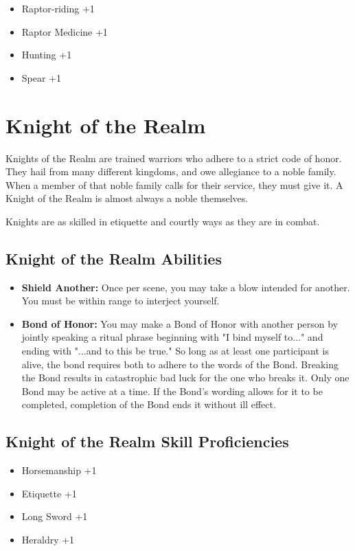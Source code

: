 \begin{multicols}{2}
\begin{itemize}
    \item Raptor-riding +1
    \item Raptor Medicine +1
    \item Hunting +1
    \item Spear +1
\end{itemize}

\section{Knight of the Realm}

Knights of the Realm are trained warriors who adhere to a strict code of 
honor. They hail from many different kingdoms, and owe allegiance to a 
noble family. When a member of that noble family calls for their service, 
they must give it. A Knight of the Realm is almost always a noble themselves.

Knights are as skilled in etiquette and courtly ways as they are in combat.

\subsection{Knight of the Realm Abilities}

\begin{itemize}
    \item \textbf{Shield Another:} Once per scene, you may take a blow 
    intended for another. You must be within range to interject yourself.
    \item \textbf{Bond of Honor:} You may make a Bond of Honor with another 
    person by jointly speaking a ritual phrase beginning with "I bind myself 
    to..." and ending with "...and to this be true." So long as at least one 
    participant is alive, the bond requires both to adhere to the words of 
    the Bond. Breaking the Bond results in catastrophic bad luck for the 
    one who breaks it. Only one Bond may be active at a time. If the Bond's 
    wording allows for it to be completed, completion of the Bond ends it 
    without ill effect.
\end{itemize}

\subsection{Knight of the Realm Skill Proficiencies}

\begin{itemize}
    \item Horsemanship +1
    \item Etiquette +1
    \item Long Sword +1
    \item Heraldry +1
\end{itemize}


\end{multicols}
